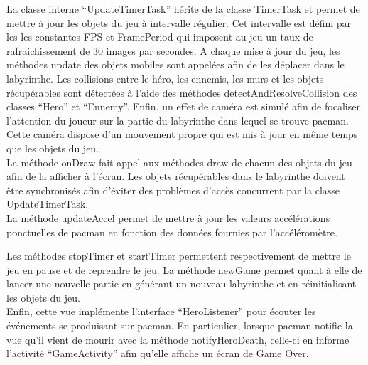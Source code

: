 \documentclass{article}
\begin{document}
La classe interne \enquote{UpdateTimerTask} hérite de la classe TimerTask et permet de mettre à jour les objets du jeu à intervalle régulier.
Cet intervalle est défini par les les constantes FPS et FramePeriod qui imposent au jeu un taux de rafraichissement de 30 images par secondes.
A chaque mise à jour du jeu, les méthodes update des objets mobiles sont appelées afin de les déplacer dans le labyrinthe.
Les collisions entre le héro, les ennemis, les murs et les objets récupérables sont détectées à l'aide des méthodes detectAndResolveCollision des classes \enquote{Hero} et \enquote{Ennemy}.
Enfin, un effet de caméra est simulé afin de focaliser l'attention du joueur sur la partie du labyrinthe dans lequel se trouve pacman.
Cette caméra dispose d'un mouvement propre qui est mis à jour en même temps que les objets du jeu.\\

La méthode onDraw fait appel aux méthodes draw de chacun des objets du jeu afin de la afficher à l'écran.
Les objets récupérables dans le labyrinthe doivent être synchronisés afin d'éviter des problèmes d'accès concurrent par la classe UpdateTimerTask.\\

La méthode updateAccel permet de mettre à jour les valeurs accélérations ponctuelles de pacman en fonction des données fournies par l'accéléromètre.

Les méthodes stopTimer et startTimer permettent respectivement de mettre le jeu en pause et de reprendre le jeu.
La méthode newGame permet quant à elle de lancer une nouvelle partie en générant un nouveau labyrinthe et en réinitialisant les objets du jeu.\\

Enfin, cette vue implémente l'interface \enquote{HeroListener} pour écouter les événements se produisant sur pacman.
En particulier, lorsque pacman notifie la vue qu'il vient de mourir avec la méthode notifyHeroDeath, celle-ci en informe l'activité \enquote{GameActivity} afin qu'elle affiche un écran de Game Over.

\end{document}
